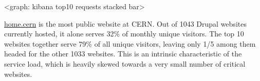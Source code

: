 <graph: kibana top10 requests stacked bar> %


\href{https://home.cern/}{home.cern} is the most public website at CERN.
Out of 1043 Drupal websites currently hosted, it alone serves 32\% of monthly unique visitors.
The top 10 websites together serve 79\% of all unique visitors, leaving only 1/5 among them headed for the other 1033 websites.
This is an intrinsic characteristic of the service load, which is heavily skewed towards a very small number of critical websites.

